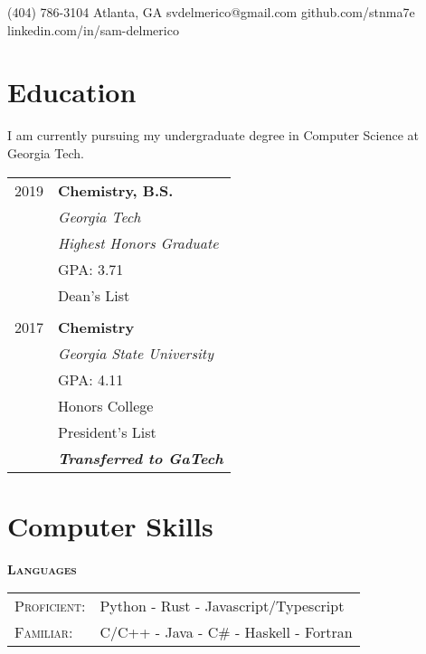 \documentclass{tccv}
\begin{document}
    {(404) 786-3104}
    {Atlanta, GA}
    {}
    {svdelmerico@gmail.com}
    {github.com/stnma7e}
    {linkedin.com/in/sam-delmerico}

\small

\begin{minipage}[t]{0.35\textwidth}
    \section{Education}
    
    {\raggedright
        I am currently pursuing my undergraduate degree in Computer Science at Georgia Tech.
        \\
    }
    
    \vspace{10pt}
    
    \begin{tabular}{rl}
        2019 & \textbf{Chemistry, B.S.} \\
             & \emph{Georgia Tech} \\
             & \emph{Highest Honors Graduate} \\
             & GPA: 3.71 \\
             & Dean's List \\
 
        \\
        
        2017 & \textbf{Chemistry} \\
             & \emph{Georgia State University} \\
             & GPA: 4.11 \\
             & Honors College \\
             & President's List \\
             & \textbf{\emph{Transferred to GaTech}}
    \end{tabular}

    \section{Computer Skills}
    \textbf{\textsc{Languages}}
  
    \begin{tabulary}{\linewidth}{lL}
        \textsc{Proficient:} & Python - Rust - Javascript/Typescript \\
        \textsc{Familiar:} &  C/C++ - Java - C\# - Haskell - Fortran
    \end{tabulary}
    \\\\
    

\end{minipage}
\end{document}
